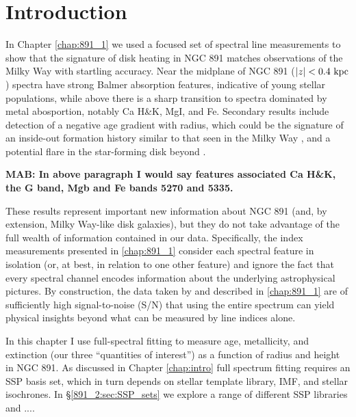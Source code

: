 \section{Introduction}

In Chapter \ref{chap:891_1} we used a focused set of spectral line
measurements to show that the signature of disk heating in NGC 891
matches observations of the Milky Way \citep[e.g.,][]{Bovy12,
  Hayden15} with startling accuracy. Near the midplane of NGC 891
($|z| < 0.4~\mathrm{kpc} $) spectra have strong Balmer absorption
features, indicative of young stellar populations, while above
 there is a sharp transition to spectra dominated by
metal abosportion, notably Ca H\&K, MgI, and Fe. Secondary results
include detection of a negative age gradient with radius, which could
be the signature of an inside-out formation history similar to that
seen in the Milky Way \citep{Bovy12, Hayden15}, and a potential flare
in the star-forming disk beyond .

{\bf MAB: In above paragraph I would say features associated Ca H\&K,
  the G band, Mgb and Fe bands 5270 and 5335.}

These results represent important new information about NGC 891 (and,
by extension, Milky Way-like disk galaxies), but they do not take
advantage of the full wealth of information contained in our
data. Specifically, the index measurements presented in
\ref{chap:891_1} consider each spectral feature in isolation
(or, at best, in relation to one other feature) and ignore the fact
that every spectral channel encodes information about the underlying
astrophysical pictures. By construction, the data taken by \GP and
described in \ref{chap:891_1} are of sufficiently high
signal-to-noise (S/N) that using the entire spectrum can yield
physical insights beyond what can be measured by line indices alone.

In this chapter I use full-spectral fitting to measure age,
metallicity, and extinction (our three ``quantities of interest'') as
a function of radius and height in NGC 891. As discussed in Chapter
\ref{chap:intro} full spectrum fitting requires an SSP basis set,
which in turn depends on stellar template library, IMF, and stellar
isochrones. In \S\ref{891_2:sec:SSP_sets} we explore a range of
different SSP libraries and ....
 


